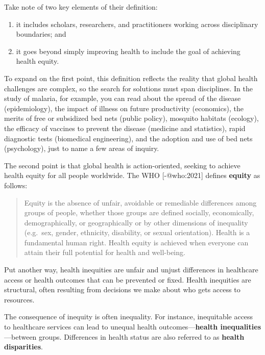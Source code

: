 \documentclass[
  letterpaper,
  DIV=11,
  numbers=noendperiod,
  oneside]{scrartcl}
\providecommand{\tightlist}{%
  \setlength{\itemsep}{0pt}\setlength{\parskip}{0pt}}\usepackage{longtable,booktabs,array}
\begin{document}
Take note of two key elements of their definition:

\begin{enumerate}
\def\labelenumi{\arabic{enumi}.}
\tightlist
\item
  it includes scholars, researchers, and practitioners working across
  disciplinary boundaries; and
\item
  it goes beyond simply improving health to include the goal of
  achieving health equity.
\end{enumerate}

To expand on the first point, this definition reflects the reality that
global health challenges are complex, so the search for solutions must
span disciplines. In the study of malaria, for example, you can read
about the spread of the disease (epidemiology), the impact of illness on
future productivity (economics), the merits of free or subsidized bed
nets (public policy), mosquito habitats (ecology), the efficacy of
vaccines to prevent the disease (medicine and statistics), rapid
diagnostic tests (biomedical engineering), and the adoption and use of
bed nets (psychology), just to name a few areas of inquiry.

The second point is that global health is action-oriented, seeking to
achieve health equity for all people worldwide. The WHO {[}-@who:2021{]}
defines \textbf{equity} as follows:

\begin{quote}
Equity is the absence of unfair, avoidable or remediable differences
among groups of people, whether those groups are defined socially,
economically, demographically, or geographically or by other dimensions
of inequality (e.g.~sex, gender, ethnicity, disability, or sexual
orientation). Health is a fundamental human right. Health equity is
achieved when everyone can attain their full potential for health and
well-being.
\end{quote}

Put another way, health inequities are unfair and unjust differences in
healthcare access or health outcomes that can be prevented or fixed.
Health inequities are structural, often resulting from decisions we make
about who gets access to resources.

The consequence of inequity is often inequality. For instance,
inequitable access to healthcare services can lead to unequal health
outcomes---\textbf{health inequalities}---between groups. Differences in
health status are also referred to as \textbf{health disparities}.
\end{document}
